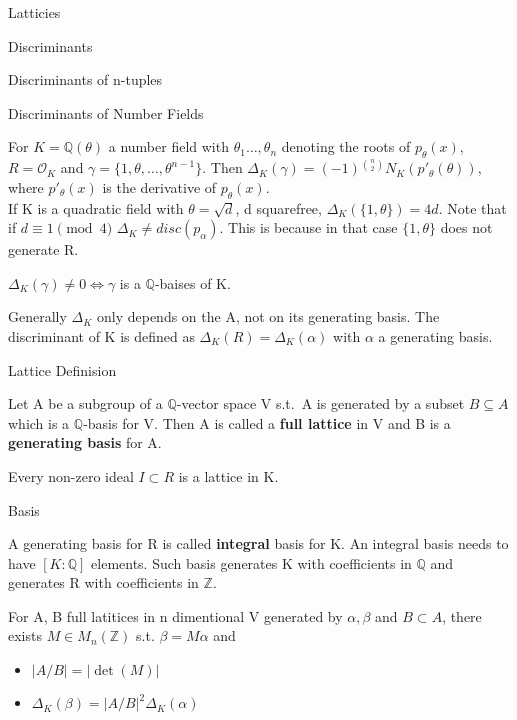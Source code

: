 \documentclass[12pt, letterpaper]{article}
\newcommand{\Q}{\mathbb{Q}}
\newcommand{\Z}{\mathbb{Z}}
\newcommand{\Ok}{\mathcal{O}}
\begin{document}
\begin{section}{Latticies}
\begin{subsection}{Discriminants}
\begin{subsubsection}{Discriminants of n-tuples}
    \end{subsubsection}

    \begin{subsubsection}{Discriminants of Number Fields}

      For \(K = \Q(\theta)\) a number field with \(\theta_{1} \dots ,
      \theta_{n}\) denoting the roots of \(p_{\theta}(x)\), \(R = \Ok_{K}\) and
      \(\gamma = \{ 1, \theta, \dots , \theta^{n - 1}\}\). Then
      \(\Delta_{K}(\gamma) = (-1){}^{{n}\choose{2}} N_{K}(p'_{\theta}
      (\theta))\), where \(p'_{\theta}(x)\) is the derivative of
      \(p_{\theta}(x)\). \\
      If K is a quadratic field with \(\theta = \sqrt{d}\), d squarefree,
      \(\Delta_{K}(\{ 1, \theta \}) = 4d\). Note that if \(d \equiv 1 \pmod{4}\)
      \(\Delta_{K} \neq disc(p_{\alpha})\). This is because in that case
      \(\{ 1, \theta \}\) does not generate R.

      \(\Delta_{K}(\gamma) \neq 0 \iff \gamma\) is a \(\Q\)-baises of K.

      Generally \(\Delta_{K}\) only depends on the A, not on its generating
      basis. The discriminant of K is defined as \(\Delta_{K}(R) =
      \Delta_{K}(\alpha)\) with \(\alpha\) a generating basis.

    \end{subsubsection}

  \end{subsection}

  \begin{subsection}{Lattice Definision}

    Let A be a subgroup of a \(\Q\)-vector space V s.t.\ A is generated by a
    subset \(B \subseteq A\) which is a \(\Q\)-basis for V. Then A is called a
    \textbf{full lattice} in V and B is a \textbf{generating basis} for A.

    Every non-zero ideal \(I \subset R\) is a lattice in K.

  \end{subsection}

  \begin{subsection}{Basis}

    A generating basis for R is called \textbf{integral} basis for K. An
    integral basis needs to have \([K : \Q]\) elements. Such basis generates
    K with coefficients in \(\Q\) and generates R with coefficients in \(\Z\).

    For A, B full latitices in n dimentional V generated by \(\alpha, \beta\)
    and \(B \subset A\), there exists \(M \in M_{n}(\Z)\) s.t.
    \(\beta = M \alpha\) and
    \begin{itemize}
      \item \(| A / B | = | \det(M) |\)
      \item \(\Delta_{K}(\beta) = | A / B |^{2} \Delta_{K}(\alpha)
            \label{BAS}\)
    \end{itemize}


\end{subsection}
\end{section}
\end{document}
